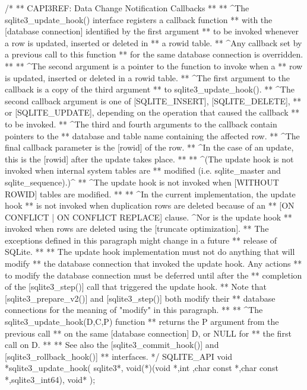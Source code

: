 \begin{Codex}[label=sqlite3.h,numbers=left]
{/*
** CAPI3REF: Data Change Notification Callbacks
**
** ^The sqlite3_update_hook() interface registers a callback function
** with the [database connection] identified by the first argument
** to be invoked whenever a row is updated, inserted or deleted in
** a rowid table.
** ^Any callback set by a previous call to this function
** for the same database connection is overridden.
**
** ^The second argument is a pointer to the function to invoke when a
** row is updated, inserted or deleted in a rowid table.
** ^The first argument to the callback is a copy of the third argument
** to sqlite3_update_hook().
** ^The second callback argument is one of [SQLITE_INSERT], [SQLITE_DELETE],
** or [SQLITE_UPDATE], depending on the operation that caused the callback
** to be invoked.
** ^The third and fourth arguments to the callback contain pointers to the
** database and table name containing the affected row.
** ^The final callback parameter is the [rowid] of the row.
** ^In the case of an update, this is the [rowid] after the update takes place.
**
** ^(The update hook is not invoked when internal system tables are
** modified (i.e. sqlite_master and sqlite_sequence).)^
** ^The update hook is not invoked when [WITHOUT ROWID] tables are modified.
**
** ^In the current implementation, the update hook
** is not invoked when duplication rows are deleted because of an
** [ON CONFLICT | ON CONFLICT REPLACE] clause.  ^Nor is the update hook
** invoked when rows are deleted using the [truncate optimization].
** The exceptions defined in this paragraph might change in a future
** release of SQLite.
**
** The update hook implementation must not do anything that will modify
** the database connection that invoked the update hook.  Any actions
** to modify the database connection must be deferred until after the
** completion of the [sqlite3_step()] call that triggered the update hook.
** Note that [sqlite3_prepare_v2()] and [sqlite3_step()] both modify their
** database connections for the meaning of "modify" in this paragraph.
**
** ^The sqlite3_update_hook(D,C,P) function
** returns the P argument from the previous call
** on the same [database connection] D, or NULL for
** the first call on D.
**
** See also the [sqlite3_commit_hook()] and [sqlite3_rollback_hook()]
** interfaces.
*/
SQLITE_API void *sqlite3_update_hook(
  sqlite3*, 
  void(*)(void *,int ,char const *,char const *,sqlite3_int64),
  void*
);

}
\end{Codex}
